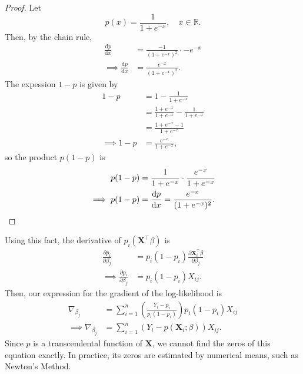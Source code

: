 \documentclass[letterpaper, reqno]{amsart}
\numberwithin{equation}{section}
\newcommand{\T}{\top} %
\newcommand{\vect}[1]{\boldsymbol{\mathbf{#1}}} %
\newcommand{\dd}{\mathrm{d}}
\newcommand{\ddx}[2]{\frac{\dd #1}{\dd #2}}
\newcommand{\ppx}[2]{\frac{\partial #1}{\partial #2}}
\newcommand{\R}{\mathbb{R}}  %
\newcommand{\sumi}[2]{\sum_{#1=1}^{#2}}
\newcommand{\Xv}{\vect{X}}
\newcommand{\Bv}{\beta}
\begin{document}
\begin{proof}
  Let
  \[ p(x) = \frac{1}{1 + e^{-x}}, \quad x \in \R. \]
  Then, by the chain rule,
  \begin{align*}
    \ddx{p}{x} &= \frac{-1}{(1 + e^{-x})^2} \cdot -e^{-x} \\
    \implies \ddx{p}{x} &= \frac{e^{-x}}{(1 + e^{-x})^2}.
  \end{align*}
  The expession $1 - p$ is given by
  \begin{align*}
    1-p &= 1 - \frac{1}{1 + e^{-x}} \\
    &= \frac{1 + e^{-x}}{1 + e^{-x}} - \frac{1}{1 + e^{-x}} \\
    &= \frac{1 + e^{-x} - 1}{1 + e^{-x}} \\
    \implies 1 - p &= \frac{e^{-x}}{1 + e^{-x}},
  \end{align*}
  so the product $p(1-p)$ is
  \begin{align*}
    p(1-p) &= \frac{1}{1+e^{-x}} \cdot \frac{e^{-x}}{1 + e^{-x}} \\
    \implies p(1-p) &= \ddx{p}{x} = \frac{e^{-x}}{(1 + e^{-x})^2}. \qedhere
  \end{align*}
\end{proof}
Using this fact, the derivative of $p_i(\Xv^\T\Bv)$ is
\begin{align*}
  \ppx{p_i}{\Bv_j} &= p_i(1 - p_i) \ppx{\Xv_i^\T\Bv}{\Bv_j} \\
  \implies \ppx{p_i}{\Bv_j} &= p_i(1 - p_i) X_{ij}.
\end{align*}
Then, our expression for the gradient of the log-likelihood is 
\begin{align*}
  \nabla_{\Bv_j} &= \sumi{i}{n} \left( \frac{Y_i - p_i}{p_i(1 - p_i)} \right) p_i(1 - p_i) X_{ij} \\
  \implies \nabla_{\Bv_j} &= \sumi{i}{n} \left( Y_i - p(\Xv_i; \Bv) \right) X_{ij}.
\end{align*}
Since $p$ is a transcendental function of $\Xv$, we cannot find the zeros of
this equation exactly. In practice, its zeros are estimated by numerical means,
such as Newton's Method.
\end{document}

